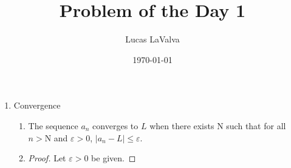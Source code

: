 \documentclass{article}
\title{Problem of the Day 1}
\author{Lucas LaValva}
\date{\today}
\begin{document}
\maketitle

\begin{enumerate}
    \item Convergence
          \begin{enumerate}
              \item
                    The sequence $a_n$ converges to $L$ when there exists
                    N such that for all $n>\mathrm{N}$ and $\varepsilon>0$,
                    $\left\lvert a_n-L\right\rvert\leq \varepsilon$.
              \item \begin{proof}
                        Let $\varepsilon>0$ be given.
                    \end{proof}

          \end{enumerate}
\end{enumerate}
\end{document}
